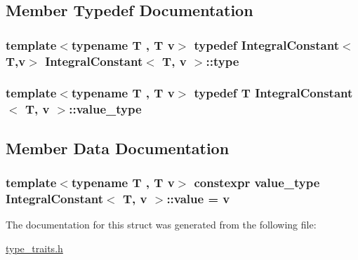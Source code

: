 \subsection{Member Typedef Documentation}
\subsubsection[{\texorpdfstring{type}{type}}]{\setlength{\rightskip}{0pt plus 5cm}template$<$typename T , T v$>$ typedef {\bf Integral\+Constant}$<$T,v$>$ {\bf Integral\+Constant}$<$ T, v $>$\+::{\bf type}}\hypertarget{struct_integral_constant_a7ba94a7b81411756fdb000c74badc6a1}{}\label{struct_integral_constant_a7ba94a7b81411756fdb000c74badc6a1}
\subsubsection[{\texorpdfstring{value\+\_\+type}{value_type}}]{\setlength{\rightskip}{0pt plus 5cm}template$<$typename T , T v$>$ typedef T {\bf Integral\+Constant}$<$ T, v $>$\+::{\bf value\+\_\+type}}\hypertarget{struct_integral_constant_ad3b4a206c2b1ba8147a1b0d100c207c8}{}\label{struct_integral_constant_ad3b4a206c2b1ba8147a1b0d100c207c8}


\subsection{Member Data Documentation}
\subsubsection[{\texorpdfstring{value}{value}}]{\setlength{\rightskip}{0pt plus 5cm}template$<$typename T , T v$>$ constexpr {\bf value\+\_\+type} {\bf Integral\+Constant}$<$ T, v $>$\+::value = v\hspace{0.3cm}{\ttfamily [static]}}\hypertarget{struct_integral_constant_aa2b0f56577a860c583f2a82e36810237}{}\label{struct_integral_constant_aa2b0f56577a860c583f2a82e36810237}


The documentation for this struct was generated from the following file\+:\begin{DoxyCompactItemize}
\item 
\hyperlink{type__traits_8h}{type\+\_\+traits.\+h}\end{DoxyCompactItemize}
